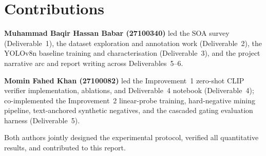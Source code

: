 \documentclass{article}
\begin{document}
\section{Contributions}
\label{sec:contributions}

\textbf{Muhammad Baqir Hassan Babar (27100340)} led the SOA survey
(Deliverable~1), the dataset exploration and annotation work
(Deliverable~2), the YOLOv8n baseline training and characterisation
(Deliverable~3), and the project narrative arc and report writing across
Deliverables~5--6.

\textbf{Momin Fahed Khan (27100082)} led the Improvement~1 zero-shot CLIP
verifier implementation, ablations, and Deliverable~4 notebook
(Deliverable~4); co-implemented the Improvement~2 linear-probe training,
hard-negative mining pipeline, text-anchored synthetic negatives, and
the cascaded gating evaluation harness (Deliverable~5).

Both authors jointly designed the experimental protocol, verified all
quantitative results, and contributed to this report.



\end{document}
